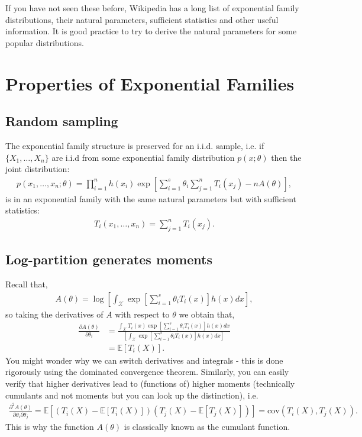 \documentclass[twoside,12pt]{article}
\begin{document}
If you have not seen these before, Wikipedia has a long list of exponential family distributions, their natural parameters, sufficient statistics and other useful information. It is good practice to try to derive the natural parameters for some popular distributions.

\section{Properties of Exponential Families}

\subsection{Random sampling}
The exponential family structure is preserved for an i.i.d. sample, i.e. if $\{X_1,\ldots,X_n\}$ are i.i.d from some exponential family distribution $p(x;\theta)$ then the joint distribution:
\begin{align*}
p(x_1,\ldots,x_n; \theta) = \prod_{i=1}^n h(x_i)  \exp \left[ \sum_{i=1}^s \theta_i \sum_{j=1}^n T_i(x_j) - n A(\theta)\right],
\end{align*}
is in an exponential family with the same natural parameters but with sufficient statistics:
\begin{align*}
T_i(x_1,\ldots,x_n) = \sum_{j=1}^n T_i(x_j). 
\end{align*}

\subsection{Log-partition generates moments}
Recall that,
\begin{align*}
A(\theta) = \log \left[ \int_{\mathcal{X}} \exp \left[ \sum_{i=1}^s \theta_i T_i(x)\right] h(x) dx \right],
\end{align*}
so taking the derivatives of $A$ with respect to $\theta$ we obtain that,
\begin{align*}
\frac{ \partial A(\theta) } {\partial \theta_i} &= \frac{\int_{\mathcal{X}} T_i(x) \exp \left[ \sum_{i=1}^s \theta_i T_i(x)\right] h(x) dx}{\left[ \int_{\mathcal{X}} \exp \left[ \sum_{i=1}^s \theta_i T_i(x)\right] h(x) dx \right]} \\
&= \mathbb{E} [T_i(X)].
\end{align*}
You might wonder why we can switch derivatives and integrals - this is done rigorously using the dominated convergence theorem.
Similarly, you can easily verify that higher derivatives lead to (functions of) higher moments (technically cumulants and not moments but you can look up the distinction), i.e.
\begin{align*}
\frac{ \partial^2 A(\theta) } {\partial \theta_i \partial \theta_j} = \mathbb{E}[ (T_i(X) - \mathbb{E}[T_i(X)]) (T_j(X) - \mathbb{E}[T_j(X)])] = \text{cov}(T_i(X),T_j(X)).
\end{align*}
This is why the function $A(\theta)$ is classically known as the cumulant function. 
\end{document}
